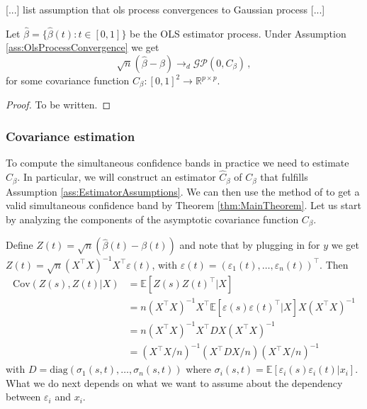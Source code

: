 \begin{assumption}\label{ass:OlsProcessConvergence}
    [...] list assumption that ols process convergences to Gaussian process [...]
\end{assumption}

\begin{theorem}
    Let $\hat{\beta} = \{\hat{\beta}(t) : t \in [0, 1]\}$ be the OLS estimator process.
    Under Assumption \ref{ass:OlsProcessConvergence} we get
    \[
        \sqrt{n}(\hat{\beta} - \beta) \to_d \mathcal{GP}(0, C_\beta) \,,
    \]
    for some covariance function $C_\beta : [0, 1]^2 \to \mathbb{R}^{p \times p}$.
\end{theorem}
\begin{proof}
    To be written.
\end{proof}

\subsubsection{Covariance estimation}

To compute the simultaneous confidence bands in practice we need to estimate $C_\beta$.
In particular, we will construct an estimator $\hat{C}_\beta$ of $C_\beta$ that fulfills
Assumption \ref{ass:EstimatorAssumptions}. We can then use the method of
 to get a valid simultaneous confidence band by Theorem
\ref{thm:MainTheorem}. Let us start by analyzing the components of the asymptotic
covariance function $C_\beta$.

Define $Z(t) = \sqrt{n}(\hat{\beta}(t) - \beta(t))$ and note that by plugging in for $y$
we get $Z(t) = \sqrt{n}(X^\top X)^{-1}X^\top \varepsilon(t)$, with $\varepsilon(t) =
(\varepsilon_1(t), \dots, \varepsilon_n(t))^\top$. Then
\begin{align*}
    \text{Cov}(Z(s), Z(t) | X)
    &= \mathbb{E}[Z(s) Z(t)^\top | X]\\
    &= n (X^\top X)^{-1} X^\top \mathbb{E}[\varepsilon(s)\varepsilon(t)^\top | X] X
    (X^\top X)^{-1}\\
    &= n (X^\top X)^{-1} X^\top D X (X^\top X)^{-1}\\
    &= (X^\top X / n)^{-1} (X^\top D X / n) (X^\top X / n)^{-1}
\end{align*}
with $D = \text{diag}(\sigma_1(s, t), \dots, \sigma_n(s, t))$ where $\sigma_i(s, t) =
\mathbb{E}[\varepsilon_i(s) \varepsilon_i(t) | x_i]$. What we do next depends on what we
want to assume about the dependency between $\varepsilon_i$ and $x_i$.

